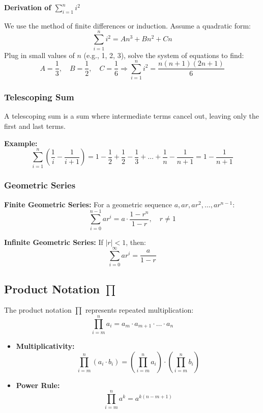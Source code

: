 \textbf{Derivation of \texorpdfstring{\(\sum_{i=1}^{n} i^2\)}{∑i²}}

We use the method of finite differences or induction. Assume a quadratic form:
\[
\sum_{i=1}^{n} i^2 = An^3 + Bn^2 + Cn
\]
Plug in small values of \(n\) (e.g., 1, 2, 3), solve the system of equations to find:
\[
A = \frac{1}{3}, \quad B = \frac{1}{2}, \quad C = \frac{1}{6}
\Rightarrow \sum_{i = 1}^{n} i^2 = \frac{n(n+1)(2n+1)}{6}
\]

\subsubsection{Telescoping Sum}

A telescoping sum is a sum where intermediate terms cancel out, leaving only the first and last terms.

\textbf{Example:}
\[
\sum_{i=1}^{n} \left( \frac{1}{i} - \frac{1}{i+1} \right)
= 1 - \frac{1}{2} + \frac{1}{2} - \frac{1}{3} + \dots + \frac{1}{n} - \frac{1}{n+1}
= 1 - \frac{1}{n+1}
\]

\subsubsection{Geometric Series}

\textbf{Finite Geometric Series:}
For a geometric sequence \(a, ar, ar^2, \dots, ar^{n-1}\):
\[
\sum_{i = 0}^{n - 1} ar^i = a \cdot \frac{1 - r^n}{1 - r}, \quad r \ne 1
\]

\textbf{Infinite Geometric Series:}
If \(|r| < 1\), then:
\[
\sum_{i = 0}^{\infty} ar^i = \frac{a}{1 - r}
\]

\subsection{Product Notation \texorpdfstring{\(\prod\)}{∏}}

The product notation \(\prod\) represents repeated multiplication:
\[
\prod_{i = m}^{n} a_i = a_m \cdot a_{m+1} \cdot \dots \cdot a_n
\]


\begin{itemize}[label=\(-\)]
    \item \textbf{Multiplicativity:}
    \[
    \prod_{i = m}^{n} (a_i \cdot b_i) = \left( \prod_{i = m}^{n} a_i \right) \cdot \left( \prod_{i = m}^{n} b_i \right)
    \]
    \item \textbf{Power Rule:}
    \[
    \prod_{i = m}^{n} a^k = a^{k(n - m + 1)}
    \]
\end{itemize}

